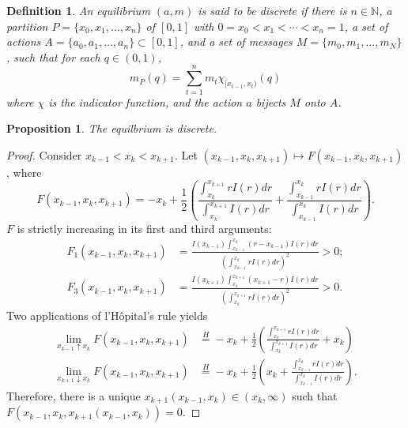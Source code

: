 \documentclass[12pt]{article}
\newtheorem{definition}{Definition}
\newtheorem{proposition}{Proposition}
\begin{document}
\begin{definition}
An equilibrium $(a,m)$ is said to be discrete if there is $n\in\mathbb{N}$, a partition $P=\{x_{0},x_{1},\ldots,x_{n}\}$ of $[0,1]$ with $0=x_{0}<x_{1}<\cdots<x_{n}=1$, a set of actions $A=\{a_{0},a_{1},\ldots,a_{n}\}\subset[0,1]$, and a set of messages $M=\{m_{0},m_{1},\ldots,m_{N}\}$, such that for each $q\in(0,1)$,
\begin{equation*}
m_{P}(q)=\sum_{t=1}^{n}m_{t}\chi_{[x_{t-1},x_{t})}(q)
\end{equation*}
where $\chi$ is the indicator function, and the action $a$ bijects $M$ onto $A$.
\end{definition}

\begin{proposition}
The equilbrium is discrete.
\end{proposition}
\begin{proof}
Consider $x_{k-1}<x_{k}<x_{k+1}$. Let $(x_{k-1},x_{k},x_{k+1})\mapsto F(x_{k-1},x_{k},x_{k+1})$, where
\begin{equation}
F(x_{k-1},x_{k},x_{k+1})=-x_{k}+\frac{1}{2}\left(\frac{\int_{x_{k}}^{x_{k+1}}{rI(r)dr}}{\int_{x_{k}}^{x_{k+1}}{I(r)dr}}+\frac{\int_{x_{k-1}}^{x_{k}}{rI(r)dr}}{\int_{x_{k-1}}^{x_{k}}{I(r)dr}}\right).
\end{equation}
$F$ is strictly increasing in its first and third arguments:
\begin{align}
F_{1}(x_{k-1},x_{k},x_{k+1})&=\frac{I(x_{k-1})\int_{x_{k-1}}^{x_{k}}{(r-x_{k-1})I(r)dr}}{\left(\int_{x_{k-1}}^{x_{k}}{rI(r)dr}\right)^{2}}>0;\\
F_{3}(x_{k-1},x_{k},x_{k+1})&=\frac{I(x_{k+1})\int_{x_{k}}^{x_{k+1}}{(x_{k+1}-r)I(r)dr}}{\left(\int_{x_{k}}^{x_{k+1}}{rI(r)dr}\right)^{2}}>0.
\end{align}
Two applications of l'H\^{o}pital's rule yields
\begin{align}
\lim_{x_{k-1}\uparrow x_{k}}F(x_{k-1},x_{k},x_{k+1})&\overset{H}{=}-x_{k}+\frac{1}{2}\left(\frac{\int_{x_{k}}^{x_{k+1}}{rI(r)dr}}{\int_{x_{k}}^{x_{k+1}}{I(r)dr}}+x_{k}\right)\\
\lim_{x_{k+1}\downarrow x_{k}}F(x_{k-1},x_{k},x_{k+1})&\overset{H}{=}-x_{k}+\frac{1}{2}\left(x_{k}+\frac{\int_{x_{k-1}}^{x_{k}}{rI(r)dr}}{\int_{x_{k-1}}^{x_{k}}{I(r)dr}}\right).
\end{align}
Therefore, there is a unique $x_{k+1}(x_{k-1},x_{k})\in(x_{k},\infty)$ such that $F(x_{k-1},x_{k},x_{k+1}(x_{k-1},x_{k}))=0$.
\end{proof}
\end{document}
